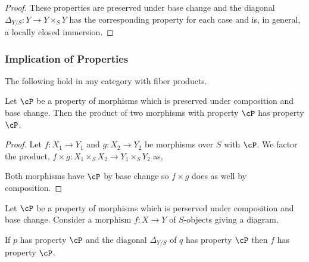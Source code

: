 \documentclass[12pt]{article}
\begin{document}
\begin{proof}
These properties are preserved under base change and the diagonal $\Delta_{Y/S} : Y \to Y \times_S Y$ has the corresponding property for each case and is, in general, a locally closed immersion.
\end{proof}

\subsubsection{Implication of Properties}

\begin{rmk}
The following hold in any category with fiber products.
\end{rmk}

\begin{prop}
Let $\cP$ be a property of morphisms which is preserved under composition and base change. Then the product of two morphisms with property $\cP$ has property $\cP$.
\end{prop}

\begin{proof}
Let $f : X_1 \to Y_1$ and $g : X_2 \to Y_2$ be morphisms over $S$ with $\cP$. We factor the product, 
$f \times g : X_1 \times_S X_2 \to Y_1 \times_S Y_2$ as,
\begin{center}
\end{center}
Both morphisms have $\cP$ by base change so $f \times g$ does as well by composition. 
\end{proof}

\begin{prop}
Let $\cP$ be a property of morphisms which is perserved under composition and base change. Consider a morphism $f : X \to Y$ of $S$-objects giving a diagram,
\begin{center}
\end{center}
If $p$ has property $\cP$ and the diagonal $\Delta_{Y/S}$ of $q$ has property $\cP$ then $f$ has property $\cP$.
\end{prop}
\end{document}
